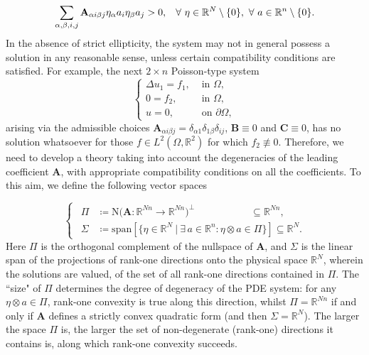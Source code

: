 \documentclass{amsart}
\numberwithin{equation}{section}
\numberwithin{thm}{section}
\theoremstyle{definition}
\renewcommand{\:}{\!:\!} %
\renewcommand{\^}[1]{^{#1}_{\phantom{l}}}
\begin{document}
\[
 \sum_{\alpha, \beta, i, j} \mathbf{A}_{\alpha i \beta j} \eta_{\alpha} a_i \eta_{\beta} a_j > 0, \hspace{0.3cm} \forall\ \eta \in \mathbb{R}^{N}\setminus \{0\},\ \forall\ a \in \mathbb{R}^{n}\setminus \{0\}.
\]
In the absence of strict ellipticity, the system may not in general possess a solution in any reasonable sense, unless certain compatibility conditions are satisfied. For example, the next $2\times n$ Poisson-type system
\[
\left\{ 
\begin{array}{rl}
\Delta u_1 =f_1 , & \text{ in }\Omega,
\\
0 =f_2 , & \text{ in }\Omega,
\\
u=0, \ & \text{ on }\partial \Omega,
\end{array}
\right.
\]
arising via the admissible choices $\mathbf{A}_{\alpha i\beta j}=\delta_{\alpha 1}\delta_{1 \beta} \delta_{ij}$, $\mathbf{B}\equiv 0$ and $\mathbf{C}\equiv 0$,  has no solution whatsoever for those $f \in L^2(\Omega, \mathbb{R}^2)$ for which $f_2\not\equiv 0$. Therefore, we need to develop a theory taking into account the degeneracies of the leading coefficient $\mathbf{A}$, with appropriate compatibility conditions on all the coefficients. To this aim, we define the following vector spaces

\begin{equation} \label{eq:01}
\left\{ \ \ \begin{split}
\Pi & \coloneqq \mathrm N\big(\mathbf{A} :\mathbb{R}^{Nn} \longrightarrow \mathbb{R}^{Nn}\big)^{\perp} \hspace{67pt} \subseteq \mathbb{R}^{Nn},
\\
\Sigma &\coloneqq \text{span} [\Big\{\eta \in \mathbb{R}^N \ \big| \ \exists \, a \in \mathbb{R}^n : \eta \otimes a \in \Pi \Big\}] \subseteq \mathbb{R}^{N}.
\end{split}
\right.
\end{equation}
Here $\Pi$ is the orthogonal complement of the nullspace of $\mathbf{A}$, and $\Sigma$ is the linear span of the projections of rank-one directions onto the physical space $\mathbb R^N$, wherein the solutions are valued, of the set of all rank-one directions contained in $\Pi$. The ``size" of $\Pi$ determines the degree of degeneracy of the PDE system: for any $\eta \otimes a \in \Pi$, rank-one convexity is true along this direction, whilst $\Pi = \mathbb{R}^{Nn}$ if and only if $\mathbf{A}$ defines a strictly convex quadratic form (and then $\Sigma = \mathbb{R}^N$).  The larger the space $\Pi$ is, the larger the set of non-degenerate (rank-one) directions it contains is, along which rank-one convexity succeeds.
\end{document}
